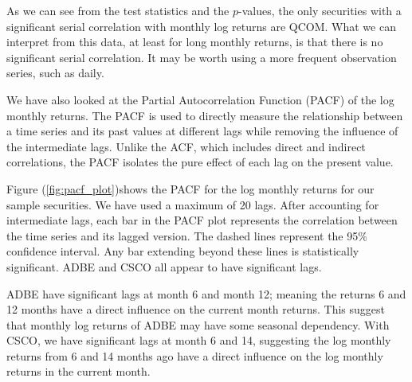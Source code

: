 As we can see from the test statistics and the $p$-values, the only securities with a significant serial correlation with monthly log returns are QCOM. What we can interpret from this data, at least for long monthly returns, is that there is no significant serial correlation. It may be worth using a more frequent observation series, such as daily.

We have also looked at the Partial Autocorrelation Function (PACF) of the log monthly returns. The PACF is used to directly measure the relationship between a time series and its past values at different lags while removing the influence of the intermediate lags. Unlike the ACF, which includes direct and indirect correlations, the PACF isolates the pure effect of each lag on the present value.

Figure (\ref{fig:pacf_plot})shows the PACF for the log monthly returns for our sample securities. We have used a maximum of 20 lags. After accounting for intermediate lags, each bar in the PACF plot represents the correlation between the time series and its lagged version. The dashed lines represent the 95\% confidence interval. Any bar extending beyond these lines is statistically significant. ADBE and CSCO all appear to have significant lags.

ADBE have significant lags at month 6 and month 12; meaning the returns 6 and 12 months have a direct influence on the current month returns. This suggest that monthly log returns of ADBE may have some seasonal dependency. With CSCO, we have significant lags at month 6 and 14, suggesting the log monthly returns from 6 and 14 months ago have a direct influence on the log monthly returns in the current month.
